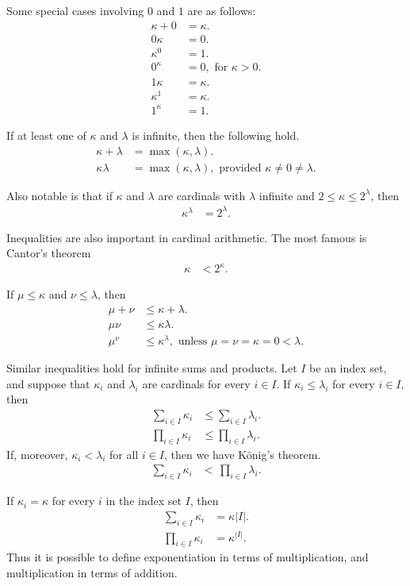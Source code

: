 \documentclass[12pt]{article}
\begin{document}
Some special cases involving $0$ and $1$ are as follows:
\begin{align*}
\kappa+0&=\kappa.\\
0\kappa&=0.\\
\kappa^0&=1.\\
0^\kappa&=0, \text{ for } \kappa>0.\\
1\kappa&=\kappa.\\
\kappa^1&=\kappa.\\
1^\kappa&=1.
\end{align*}

If at least one of $\kappa$ and $\lambda$ is infinite, then the following hold.
\begin{align*}
\kappa+\lambda&=\max(\kappa,\lambda).\\
\kappa\lambda&=\max(\kappa,\lambda), \text{ provided } \kappa\ne0\ne\lambda.
\end{align*}

Also notable is that if $\kappa$ and $\lambda$ are cardinals
with $\lambda$ infinite and $2 \le \kappa \le 2^\lambda$,
then
\begin{align*}
\kappa^\lambda&=2^\lambda.
\end{align*}

Inequalities are also important in cardinal arithmetic.
The most famous is Cantor's theorem
\begin{align*}
\kappa&<2^\kappa.
\end{align*}

If $\mu\le\kappa$ and $\nu\le\lambda$, then
\begin{align*}
\mu+\nu&\le\kappa+\lambda.\\
\mu\nu&\le\kappa\lambda.\\
\mu^\nu&\le\kappa^\lambda, \text{ unless } \mu=\nu=\kappa=0<\lambda.
\end{align*}

Similar inequalities hold for infinite sums and products. 
Let $I$ be an index set, 
and suppose that $\kappa_i$ and $\lambda_i$ are cardinals for every $i\in I$.
If $\kappa_i\le\lambda_i$ for every $i\in I$, then 
\begin{align*}
\sum_{i\in I}\kappa_i&\le\sum_{i\in I}\lambda_i.\\
\prod_{i\in I}\kappa_i&\le\prod_{i\in I}\lambda_i.
\end{align*}
If, moreover, $\kappa_i<\lambda_i$ for all $i\in I$, 
then we have K\"onig's theorem.
\begin{align*}
\sum_{i\in I}\kappa_i&<\,\prod_{i\in I}\lambda_i.
\end{align*}

If $\kappa_i=\kappa$ for every $i$ in the index set $I$, then
\begin{align*}
\sum_{i\in I}\kappa_i&=\kappa|I|.\\
\prod_{i\in I}\kappa_i&=\kappa^{|I|}.
\end{align*}
Thus it is possible to define exponentiation in terms of multiplication,
and multiplication in terms of addition.
\end{document}
